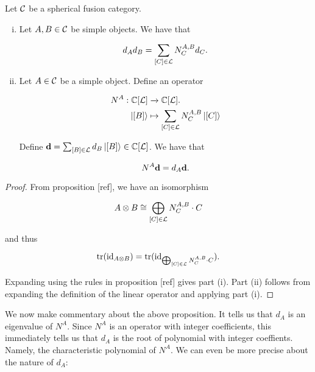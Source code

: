 \begin{prop} Let ${\mathcal C}$ be a spherical fusion category.

\begin{enumerate}[(i)]
\item Let $A,B\in {\mathcal C}$ be simple objects. We have that

$$d_Ad_B=\sum_{[C]\in {\mathcal L}}N^{A,B}_C d_C.$$

\item Let $A\in {\mathcal C}$ be a simple object. Define an operator

 \begin{align*}
N^{A}:{\mathbb C}[{\mathcal L}]&\xrightarrow{} {\mathbb C}[{\mathcal L}].\\
\ket{[B]}&\mapsto \sum_{[C]\in {\mathcal L}} N^{A,B}_C \ket{[C]}
\end{align*}

Define $\bold{d} = \sum_{[B]\in {\mathcal L}} d_{B}\ket{[B]}\in {\mathbb C}[{\mathcal L}]$. We have that

$$N^{A}\bold{d}=d_{A}\bold{d}.$$

\end{enumerate}

\end{prop}
\begin{proof} From proposition [ref], we have an isomorphism

$$A\otimes B \cong \bigoplus_{[C]\in {\mathcal L}}N^{A,B}_{C}\cdot C$$

and thus

$$\operatorname{tr}(\operatorname{id}_{A\otimes B})=\operatorname{tr}(\operatorname{id}_{\bigoplus_{[C]\in {\mathcal L}}N^{A,B}_{C}\cdot C}).$$

Expanding using the rules in proposition [ref] gives part (i). Part (ii) follows from expanding the definition of the linear operator and applying part (i).
\end{proof}

We now make commentary about the above proposition. It tells us that $d_A$ is an eigenvalue of $N^A$. Since $N^A$ is an operator with integer coefficients, this immediately tells us that $d_A$ is the root of polynomial with integer coeffients. Namely, the characteristic polynomial of $N^A$. We can even be more precise about the nature of $d_A$:


